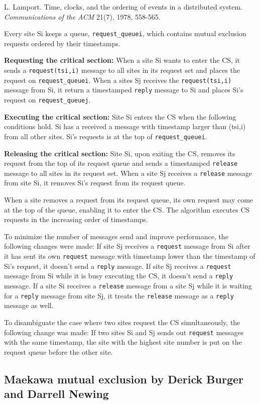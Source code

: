 \documentclass[11pt]{article}
\newcommand{\p}[1]{\texttt{#1}}
\begin{document}
L. Lamport. Time, clocks, and the ordering of
events in a distributed system.
\emph{Communications of the ACM} 21(7), 1978, 558-565.

Every site Si keeps a queue, \p{request\_queuei}, which contains mutual exclusion
requests ordered by their timestamps.

\textbf{Requesting the critical section:}
When a site Si wants to enter the CS, it sends a \p{request(tsi,i)} message
to all sites in its request set and places the request on \p{request\_queuei}.
When a sites Sj receives the \p{request(tsi,i)} message from Si, it return
a timestamped \p{reply} message to Si and places Si's request on \p{request\_queuej}.

\textbf{Executing the critical section:}
Site Si enters the CS when the following conditions hold.
Si has a received a message with timestamp larger than (tsi,i) from all
other sites.
Si's requests is at the top of \p{request\_queuei}.

\textbf{Releasing the critical section:}
Site Si, upon exiting the CS, removes its request from the top of its request
queue and sends a timestamped \p{release} message to all sites in its request set.
When a site Sj receives a \p{release} message from site Si, it removes Si's
request from its request queue.

When a site removes a request from its request queue, its own request may
come at the top of the queue, enabling it to enter the CS. The algorithm
executes CS requests in the increasing order of timestamps.

To minimize the number of messages send and improve performance,
the following changes were made:
If site Sj receives a \p{request} message from Si after it has sent its own
\p{request} message with timestamp lower than the timestamp of Si's request,
it doesn't send a \p{reply} message.
If site Sj receives a \p{request} message from Si while it is busy executing
the CS, it doesn't send a \p{reply} message.
If a site Si receives a \p{release} message from a site Sj while it is waiting
for a \p{reply} message from site Sj, it treats the \p{release} message as a \p{reply}
message as well.

To disambiguate the case where two sites request the CS simultaneously,
the following change was made:
If two sites Si and Sj sends out \p{request} messages with the same timestamp,
the site with the highest site number is put on the request queue before
the other site.

\subsection{Maekawa mutual exclusion by Derick Burger and Darrell Newing}
\end{document}
